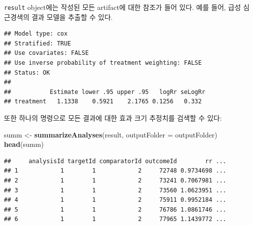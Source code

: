 \documentclass[10.5pt]{book}
\newenvironment{Shaded}{\begin{snugshade}}{\end{snugshade}}
\newcommand{\KeywordTok}[1]{\textcolor[rgb]{0.13,0.29,0.53}{\textbf{#1}}}
\newcommand{\DataTypeTok}[1]{\textcolor[rgb]{0.13,0.29,0.53}{#1}}
\newcommand{\DecValTok}[1]{\textcolor[rgb]{0.00,0.00,0.81}{#1}}
\newcommand{\StringTok}[1]{\textcolor[rgb]{0.31,0.60,0.02}{#1}}
\newcommand{\OperatorTok}[1]{\textcolor[rgb]{0.81,0.36,0.00}{\textbf{#1}}}
\newcommand{\NormalTok}[1]{#1}
\theoremstyle{definition}
\theoremstyle{definition}
\theoremstyle{definition}
\theoremstyle{remark}
\begin{document}
\texttt{result} object에는 작성된 모든 artifact에 대한 참조가 들어 있다.
예를 들어, 급성 심근경색의 결과 모델을 추출할 수 있다.

\begin{Shaded}
\end{Shaded}

\begin{verbatim}
## Model type: cox
## Stratified: TRUE
## Use covariates: FALSE
## Use inverse probability of treatment weighting: FALSE
## Status: OK
## 
##           Estimate lower .95 upper .95   logRr seLogRr
## treatment   1.1338    0.5921    2.1765 0.1256   0.332
\end{verbatim}

또한 하나의 명령으로 모든 결과에 대한 효과 크기 추정치를 검색할 수 있다:

\begin{Shaded}
\begin{Highlighting}[]
\NormalTok{summ <-}\StringTok{ }\KeywordTok{summarizeAnalyses}\NormalTok{(result, }\DataTypeTok{outputFolder =}\NormalTok{ outputFolder)}
\KeywordTok{head}\NormalTok{(summ)}
\end{Highlighting}
\end{Shaded}

\begin{verbatim}
##     analysisId targetId comparatorId outcomeId        rr ...
## 1            1        1            2     72748 0.9734698 ...
## 2            1        1            2     73241 0.7067981 ...
## 3            1        1            2     73560 1.0623951 ...
## 4            1        1            2     75911 0.9952184 ...
## 5            1        1            2     76786 1.0861746 ...
## 6            1        1            2     77965 1.1439772 ...
\end{verbatim}
\end{document}
